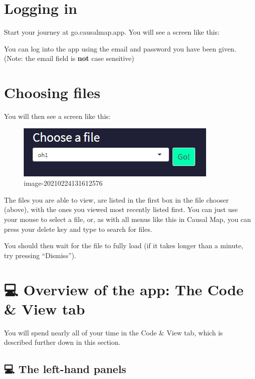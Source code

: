 \documentclass[
]{book}
\begin{document}
\hypertarget{logging-in}{%
\section{Logging in}\label{logging-in}}

Start your journey at go.causalmap.app. You will see a screen like this:

You can log into the app using the email and password you have been given.
(Note: the email field is \textbf{not} case sensitive)

\hypertarget{choosing-files-1}{%
\section{Choosing files}\label{choosing-files-1}}

You will then see a screen like this:

\begin{figure}
\centering
\includegraphics{_assets/image-20210224131612576.png}
\caption{image-20210224131612576}
\end{figure}

The files you are able to view, are listed in the first box in the file chooser (above), with the ones you viewed most recently listed first. You can just use your mouse to select a file, or, as with all menus like this in Causal Map, you can press your delete key and type to search for files.

You should then wait for the file to fully load (if it takes longer than a minute, try pressing ``Dismiss'').

\hypertarget{overview-of-the-app-the-code-view-tab-1}{%
\section{💻 Overview of the app: The Code \& View tab}\label{overview-of-the-app-the-code-view-tab-1}}

You will spend nearly all of your time in the Code \& View tab, which is described further down in this section.

\hypertarget{the-left-hand-panels-1}{%
\subsection{💻 The left-hand panels}\label{the-left-hand-panels-1}}
\end{document}
